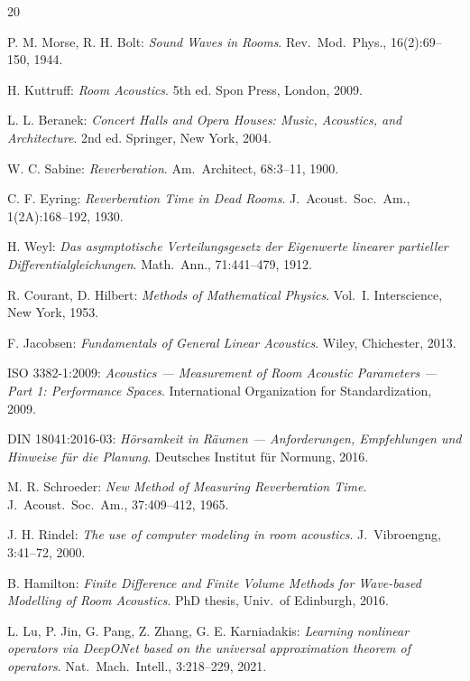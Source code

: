 ﻿\documentclass[12pt, a4paper]{article}
\theoremstyle{definition}
\theoremstyle{remark}
\begin{document}
\begin{thebibliography}{20}

  P. M. Morse, R. H. Bolt:
  \textit{Sound Waves in Rooms}.
  Rev.\ Mod.\ Phys., 16(2):69--150, 1944.

  H. Kuttruff:
  \textit{Room Acoustics}. 5th ed.
  Spon Press, London, 2009.

  L. L. Beranek:
  \textit{Concert Halls and Opera Houses: Music, Acoustics, and Architecture}.
  2nd ed. Springer, New York, 2004.

  W. C. Sabine:
  \textit{Reverberation}.
  Am.\ Architect, 68:3--11, 1900.

  C. F. Eyring:
  \textit{Reverberation Time in Dead Rooms}.
  J.\ Acoust.\ Soc.\ Am., 1(2A):168--192, 1930.

  H. Weyl:
  \textit{Das asymptotische Verteilungsgesetz der Eigenwerte linearer
  partieller Differentialgleichungen}.
  Math.\ Ann., 71:441--479, 1912.

  R. Courant, D. Hilbert:
  \textit{Methods of Mathematical Physics}. Vol.\ I.
  Interscience, New York, 1953.

  F. Jacobsen:
  \textit{Fundamentals of General Linear Acoustics}.
  Wiley, Chichester, 2013.

  ISO 3382-1:2009:
  \textit{Acoustics --- Measurement of Room Acoustic Parameters ---
  Part 1: Performance Spaces}.
  International Organization for Standardization, 2009.

  DIN 18041:2016-03:
  \textit{Hörsamkeit in Räumen --- Anforderungen, Empfehlungen und Hinweise
  für die Planung}.
  Deutsches Institut für Normung, 2016.

  M. R. Schroeder:
  \textit{New Method of Measuring Reverberation Time}.
  J.\ Acoust.\ Soc.\ Am., 37:409--412, 1965.

  J. H. Rindel:
  \textit{The use of computer modeling in room acoustics}.
  J.\ Vibroengng, 3:41--72, 2000.

  B. Hamilton:
  \textit{Finite Difference and Finite Volume Methods for Wave-based Modelling
  of Room Acoustics}.
  PhD thesis, Univ.\ of Edinburgh, 2016.

  L. Lu, P. Jin, G. Pang, Z. Zhang, G. E. Karniadakis:
  \textit{Learning nonlinear operators via DeepONet based on the universal
  approximation theorem of operators}.
  Nat.\ Mach.\ Intell., 3:218--229, 2021.


\end{thebibliography}
\end{document}
